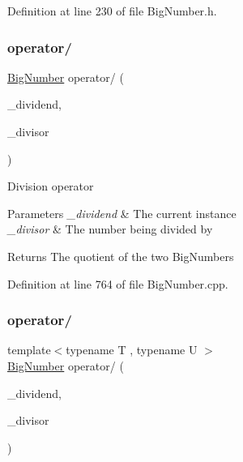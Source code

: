 Definition at line 230 of file Big\+Number.\+h.

\mbox{\label{class_big_nums_1_1_big_number_a1f3bac79755532f059e42f08126001fe}} 
\subsubsection{\texorpdfstring{operator/}{operator/}\hspace{0.1cm}{\footnotesize\ttfamily [1/2]}}
{\footnotesize\ttfamily \mbox{\hyperlink{class_big_nums_1_1_big_number}{Big\+Number}} operator/ (\begin{DoxyParamCaption}\item[{\mbox{\hyperlink{class_big_nums_1_1_big_number}{Big\+Number}}}]{\+\_\+dividend,  }\item[{const \mbox{\hyperlink{class_big_nums_1_1_big_number}{Big\+Number}} \&}]{\+\_\+divisor }\end{DoxyParamCaption})\hspace{0.3cm}{\ttfamily [friend]}}

Division operator 
\begin{DoxyParams}{Parameters}
{\em \+\_\+dividend} & The current instance \\
\hline
{\em \+\_\+divisor} & The number being divided by \\
\hline
\end{DoxyParams}
\begin{DoxyReturn}{Returns}
The quotient of the two Big\+Numbers 
\end{DoxyReturn}


Definition at line 764 of file Big\+Number.\+cpp.

\mbox{\label{class_big_nums_1_1_big_number_a90fc1955ccdc202a1d41857dbe8a81a3}} 
\subsubsection{\texorpdfstring{operator/}{operator/}\hspace{0.1cm}{\footnotesize\ttfamily [2/2]}}
{\footnotesize\ttfamily template$<$typename T , typename U $>$ \\
\mbox{\hyperlink{class_big_nums_1_1_big_number}{Big\+Number}} operator/ (\begin{DoxyParamCaption}\item[{const T \&}]{\+\_\+dividend,  }\item[{const U \&}]{\+\_\+divisor }\end{DoxyParamCaption})\hspace{0.3cm}{\ttfamily [friend]}}



